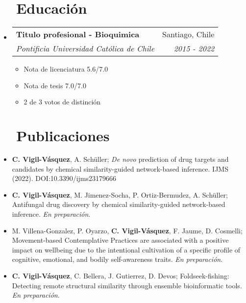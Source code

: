 \documentclass[letter,20pt]{article}
\makeatletter
\newcommand{\resumeItemWithoutTitle}[1]{
  \item\small{
    {\vspace{-2pt}}
  }
}
\newcommand{\resumeSubheading}[4]{
  \vspace{-1pt}\item
    \begin{tabular*}{0.97\textwidth}{l@{\extracolsep{\fill}}r}
      \textbf{#1} & #2 \\
      \textit{#3} & \textit{#4} \\
    \end{tabular*}\vspace{-5pt}
}
\newcommand{\resumeSubHeadingListStart}{\begin{itemize}[leftmargin=*]}
\newcommand{\resumeSubHeadingListEnd}{\end{itemize}}
\makeatother
\begin{document}
\section{~~Educación}
\resumeSubHeadingListStart
\resumeSubheading
{Titulo profesional - Bioquimica}{Santiago, Chile}
{Pontificia Universidad Católica de Chile}{2015 - 2022}
\vspace{3pt}
\small{
	\begin{multicols}{3}
		\begin{itemize}
			\item Nota de licenciatura 5.6/7.0
			\item Nota de tesis 7.0/7.0
			\item 2 de 3 votos de distinción
		\end{itemize}
	\end{multicols}
	}
\resumeSubHeadingListEnd
\vspace{-15pt}
\section{~~Publicaciones}
\resumeSubHeadingListStart
\vspace{2pt}
\resumeItemWithoutTitle{}{\textbf{C. Vigil-Vásquez}, A. Schüller; \textit{De novo} prediction of drug targets and candidates by chemical similarity-guided network-based inference. IJMS (2022). DOI:10.3390/ijms23179666}
\resumeItemWithoutTitle{}{\textbf{C. Vigil-Vásquez}, M. Jimenez-Socha, P. Ortiz-Bermudez, A. Schüller; Antifungal drug discovery by chemical similarity-guided network-based inference. \textit{En preparación}}.
\resumeItemWithoutTitle{}{M. Villena-Gonzalez, P. Oyarzo, \textbf{C. Vigil-Vásquez}, F. Jaume, D. Cosmelli; Movement-based Contemplative Practices are associated with a positive impact on wellbeing due to the intentional cultivation of a specific profile of cognitive, emotional, and bodily self-awareness traits. \textit{En preparación}}.
\resumeItemWithoutTitle{}{\textbf{C. Vigil-Vásquez}, C. Bellera, J. Gutierrez, D. Devos; Foldseek-fishing: Detecting remote structural similarity through ensemble bioinformatic tools. \textit{En preparación}}.
\resumeSubHeadingListEnd
\end{document}
